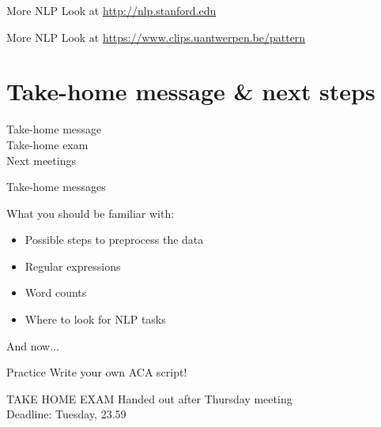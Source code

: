 \documentclass{beamer}
\begin{document}
\begin{frame}{More NLP}
\Huge{Look at \url{http://nlp.stanford.edu}}
\end{frame}


\begin{frame}{More NLP}
\Huge{Look at \url{https://www.clips.uantwerpen.be/pattern}}
\end{frame}



\section{Take-home message \& next steps}
\begin{frame}
Take-home message\\
Take-home exam\\
Next meetings
\end{frame}


\begin{frame}{Take-home messages}
\begin{block}{What you should be familiar with:}
\begin{itemize}
\item Possible steps to preprocess the data
\item Regular expressions
\item Word counts
\item Where to look for NLP tasks
\end{itemize}
\end{block}
\end{frame}


\begin{frame}{And now...}


\begin{block}{Practice}
Write your own ACA script!
\end{block}

\begin{block}{TAKE HOME EXAM}
	Handed out after Thursday meeting\\
	Deadline: Tuesday, 23.59
\end{block}


\end{frame}
\end{document}
